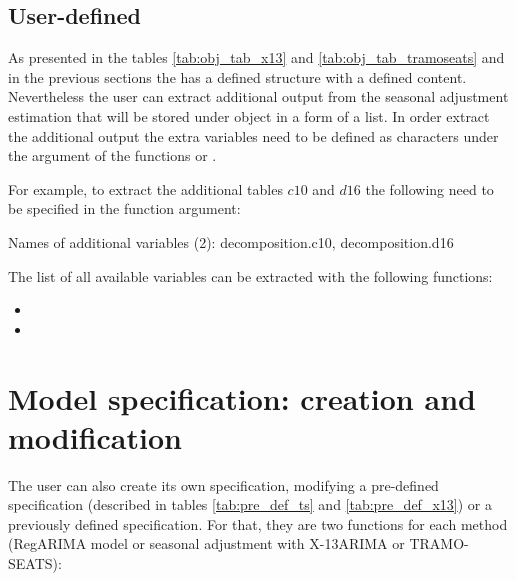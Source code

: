 \documentclass[article]{jss}
\begin{document}
\hypertarget{user-def}{%
\subsection{User-defined}\label{user-def}}

As presented in the tables \ref{tab:obj_tab_x13} and
\ref{tab:obj_tab_tramoseats} and in the previous sections the
 has a defined structure with a defined content.
Nevertheless the user can extract additional output from the seasonal
adjustment estimation that will be stored under 
object in a form of a list. In order extract the additional output the
extra variables need to be defined as characters under the argument
 of the functions  or .

For example, to extract the additional tables \(c10\) and \(d16\) the
following need to be specified in the function argument:

\begin{CodeChunk}


\begin{CodeOutput}
Names of additional variables (2):
decomposition.c10, decomposition.d16
\end{CodeOutput}
\end{CodeChunk}

The list of all available variables can be extracted with the following
functions:

\begin{itemize}
\item
\item
\end{itemize}

\hypertarget{user-def-spec}{%
\section{Model specification: creation and
modification}\label{user-def-spec}}

The user can also create its own specification, modifying a pre-defined
specification (described in tables \ref{tab:pre_def_ts} and
\ref{tab:pre_def_x13}) or a previously defined specification. For that,
they are two functions for each method (RegARIMA model or seasonal
adjustment with X-13ARIMA or TRAMO-SEATS):
\end{document}
